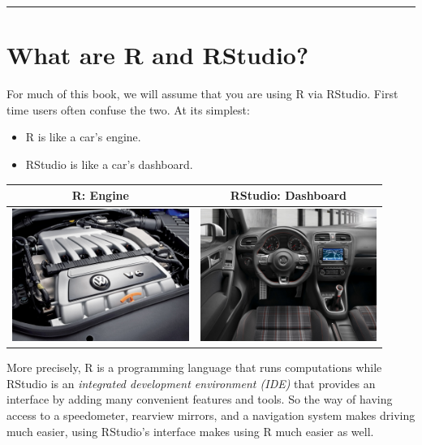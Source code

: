 \documentclass[12pt, krantz2,]{krantz}
\providecommand{\tightlist}{%
  \setlength{\itemsep}{0pt}\setlength{\parskip}{0pt}}
\begin{document}
\begin{center}\rule{0.5\linewidth}{\linethickness}\end{center}

\hypertarget{r-rstudio}{%
\section{What are R and RStudio?}\label{r-rstudio}}

For much of this book, we will assume that you are using R via RStudio. First time users often confuse the two. At its simplest:

\begin{itemize}
\tightlist
\item
  R is like a car's engine.
\item
  RStudio is like a car's dashboard.
\end{itemize}

\begin{longtable}[]{@{}cc@{}}
\toprule
R: Engine & RStudio: Dashboard\tabularnewline
\midrule
\endhead
\includegraphics[width=\textwidth,height=1.7in]{images/engine.jpg} & \includegraphics[width=\textwidth,height=1.7in]{images/dashboard.jpg}\tabularnewline
\bottomrule
\end{longtable}

More precisely, R is a programming language that runs computations while RStudio is an \emph{integrated development environment (IDE)} that provides an interface by adding many convenient features and tools. So the way of having access to a speedometer, rearview mirrors, and a navigation system makes driving much easier, using RStudio's interface makes using R much easier as well.
\end{document}
